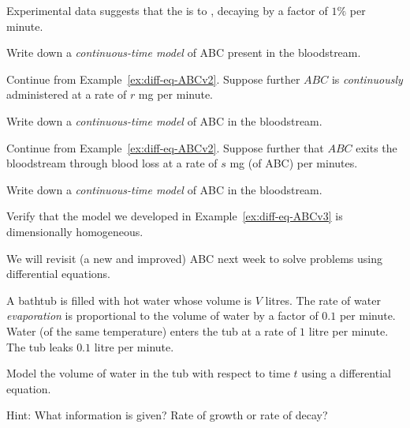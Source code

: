 \documentclass[../main.tex]{subfiles}
\begin{document}
\begin{example} \label{ex:diff-eq-ABCv1}
  Experimental data suggests that the  is  to , decaying by a factor of \(1\%\) per minute.

  Write down a \emph{continuous-time model} of ABC present in the bloodstream.
\end{example}

\begin{example} \label{ex:diff-eq-ABCv2}
  Continue from Example~\eqref{ex:diff-eq-ABCv2}.  Suppose further \(ABC\) is \emph{continuously} administered at a rate of \(r\) mg per minute. 

  Write down a \emph{continuous-time model} of ABC in the bloodstream.
\end{example}

\begin{example} \label{ex:diff-eq-ABCv3}
  Continue from Example~\eqref{ex:diff-eq-ABCv2}.  Suppose further that \(ABC\) exits the bloodstream through blood loss at a rate of \(s\) mg (of ABC) per minutes. 

  Write down a \emph{continuous-time model} of ABC in the bloodstream.
\end{example}

\begin{example}
  Verify that the model we developed in Example~\ref{ex:diff-eq-ABCv3} is dimensionally homogeneous.
\end{example}

We will revisit (a new and improved) ABC next week to solve problems using differential equations.
\clearpage

\begin{example}[bathtub] 
  A bathtub is filled with hot water whose volume is \(V\) litres. The rate of water \emph{evaporation} is proportional to the volume of water by a factor of \(0.1\) per minute.  Water (of the same temperature) enters the tub at a rate of \(1\) litre per minute. The tub leaks \(0.1\) litre per minute. 

  Model the volume of water in the tub with respect to time \(t\) using a differential equation.

  Hint: What information is given? Rate of growth or rate of decay?
\end{example}
\end{document}
